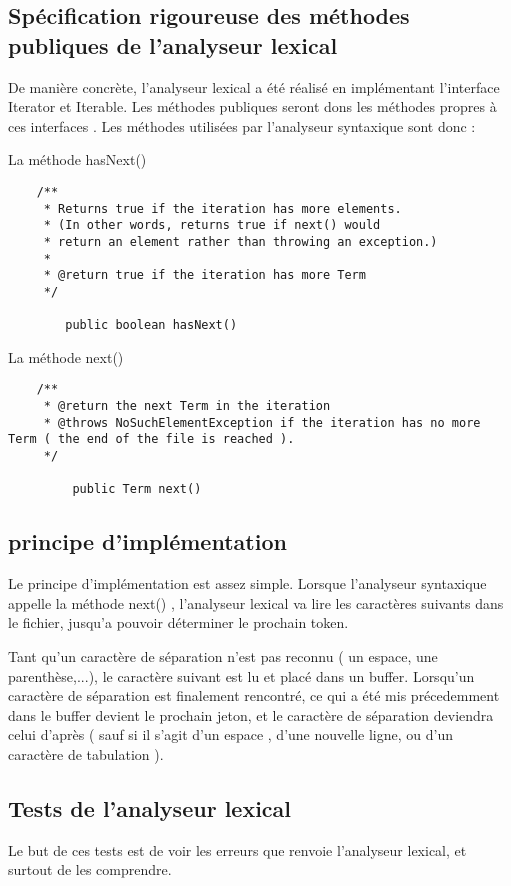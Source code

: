 \subsection{Spécification rigoureuse des méthodes publiques de l'analyseur lexical}

De manière concrète, l'analyseur lexical a été réalisé en implémentant l'interface Iterator et Iterable. Les méthodes publiques seront dons les méthodes propres à ces interfaces . Les méthodes utilisées par l'analyseur syntaxique sont donc :

La méthode hasNext()
\begin{verbatim}
    /**
     * Returns true if the iteration has more elements.
     * (In other words, returns true if next() would
     * return an element rather than throwing an exception.)
     *
     * @return true if the iteration has more Term
     */
		
		public boolean hasNext()
\end{verbatim}


La méthode next()
\begin{verbatim}
    /**
     * @return the next Term in the iteration
     * @throws NoSuchElementException if the iteration has no more Term ( the end of the file is reached ).
     */

		 public Term next()
\end{verbatim}


\subsection{principe d'implémentation}

Le principe d'implémentation est assez simple. Lorsque l'analyseur syntaxique appelle la méthode next() , l'analyseur lexical va lire les caractères suivants dans le fichier, jusqu'a pouvoir déterminer le prochain token.

Tant qu'un caractère de séparation n'est pas reconnu ( un espace, une parenthèse,...), le caractère suivant est lu et placé dans un buffer. Lorsqu'un caractère de séparation est finalement rencontré, ce qui a été mis précedemment dans le buffer devient le prochain jeton, et le caractère de séparation deviendra celui d'après ( sauf si il s'agit d'un espace , d'une nouvelle ligne, ou d'un caractère de tabulation ).

\subsection{Tests de l'analyseur lexical}
Le but de ces tests est de voir les erreurs que renvoie l'analyseur lexical, et surtout de les comprendre.

